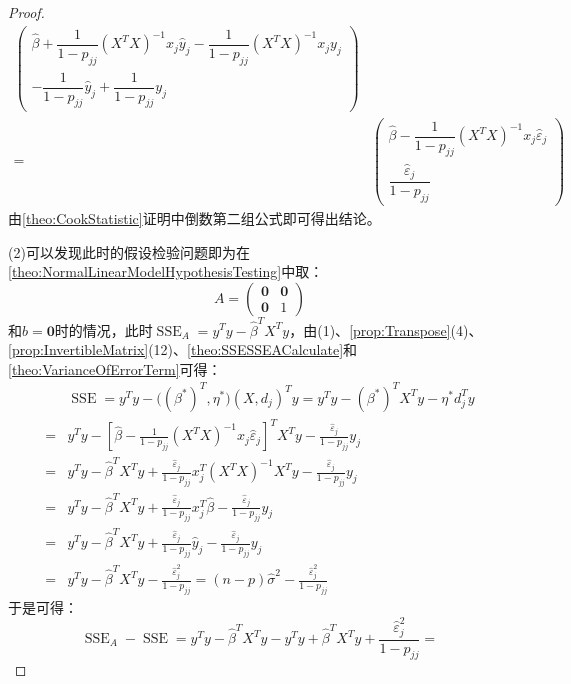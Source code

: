 \begin{proof}
\begin{align*}
\begin{pmatrix}
		\hat{\beta}+\dfrac{1}{1-p_{jj}}(X^TX)^{-1}x_j\hat{y}_j-\dfrac{1}{1-p_{jj}}(X^TX)^{-1}x_jy_j \\
		-\dfrac{1}{1-p_{jj}}\hat{y}_j+\dfrac{1}{1-p_{jj}}y_j
	\end{pmatrix} \\
	=&
	\begin{pmatrix}
		\hat{\beta}-\dfrac{1}{1-p_{jj}}(X^TX)^{-1}x_j\hat{\varepsilon}_j \\
		\dfrac{\hat{\varepsilon}_j}{1-p_{jj}}
	\end{pmatrix}
	\end{align*}
	由\cref{theo:CookStatistic}证明中倒数第二组公式即可得出结论。\par
	(2)可以发现此时的假设检验问题即为在\cref{theo:NormalLinearModelHypothesisTesting}中取：
	\begin{equation*}
		A=
		\begin{pmatrix}
			\mathbf{0} & \mathbf{0} \\
			\mathbf{0} & 1
		\end{pmatrix}
	\end{equation*}
	和$b=\mathbf{0}$时的情况，此时$\operatorname{SSE}_A=y^Ty-\hat{\beta}^TX^Ty$，由(1)、\cref{prop:Transpose}(4)、\cref{prop:InvertibleMatrix}(12)、\cref{theo:SSESSEACalculate}和\cref{theo:VarianceOfErrorTerm}可得：
	\begin{align*}
		&\operatorname{SSE}=y^Ty-\Big((\beta^*)^T,\eta^*\Big)(X,d_j)^Ty=y^Ty-(\beta^*)^TX^Ty-\eta^*d_j^Ty \\
		=&y^Ty-\left[\hat{\beta}-\frac{1}{1-p_{jj}}(X^TX)^{-1}x_j\hat{\varepsilon}_j\right]^TX^Ty-\frac{\hat{\varepsilon}_j}{1-p_{jj}}y_j \\
		=&y^Ty-\hat{\beta}^TX^Ty+\frac{\hat{\varepsilon}_j}{1-p_{jj}}x_j^T(X^TX)^{-1}X^Ty-\frac{\hat{\varepsilon}_j}{1-p_{jj}}y_j \\
		=&y^Ty-\hat{\beta}^TX^Ty+\frac{\hat{\varepsilon}_j}{1-p_{jj}}x_j^T\hat{\beta}-\frac{\hat{\varepsilon}_j}{1-p_{jj}}y_j \\
		=&y^Ty-\hat{\beta}^TX^Ty+\frac{\hat{\varepsilon}_j}{1-p_{jj}}\hat{y}_j-\frac{\hat{\varepsilon}_j}{1-p_{jj}}y_j \\
		=&y^Ty-\hat{\beta}^TX^Ty-\frac{\hat{\varepsilon}_j^2}{1-p_{jj}}=(n-p)\hat{\sigma}^2-\frac{\hat{\varepsilon}_j^2}{1-p_{jj}}
	\end{align*}
	于是可得：
	\begin{equation*}
		\operatorname{SSE}_A-\operatorname{SSE}=y^Ty-\hat{\beta}^TX^Ty-y^Ty+\hat{\beta}^TX^Ty+\frac{\hat{\varepsilon}_j^2}{1-p_{jj}}=
	\end{equation*}

\end{proof}
